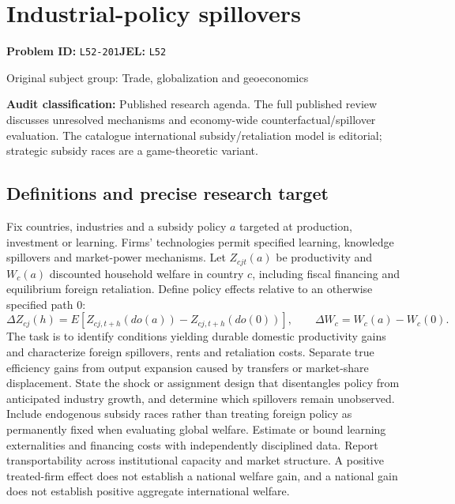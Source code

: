\documentclass[11pt,a4paper]{article}
\begin{document}
\section*{Industrial-policy spillovers}
\textbf{Problem ID:} \texttt{L52-201}\quad \textbf{JEL:} \texttt{L52}\par
\label{problem:OP-0346}
{\sffamily\small\color{muted}Original subject group: Trade, globalization and geoeconomics\par}
\label{definitions:problem:30007628}
\textbf{Audit classification:} Published research agenda. The full published review discusses unresolved mechanisms and economy-wide counterfactual/spillover evaluation. The catalogue international subsidy/retaliation model is editorial; strategic subsidy races are a game-theoretic variant.
\subsection*{Definitions and precise research target}
Fix countries, industries and a subsidy policy \(a\) targeted at production, investment or learning. Firms' technologies permit specified learning, knowledge spillovers and market-power mechanisms. Let \(Z_{cjt}(a)\) be productivity and \(W_c(a)\) discounted household welfare in country \(c\), including fiscal financing and equilibrium foreign retaliation. Define policy effects relative to an otherwise specified path \(0\):
\[\Delta Z_{cj}(h)=E[Z_{cj,t+h}(do(a))-Z_{cj,t+h}(do(0))],\qquad \Delta W_c=W_c(a)-W_c(0).\]
The task is to identify conditions yielding durable domestic productivity gains and characterize foreign spillovers, rents and retaliation costs. Separate true efficiency gains from output expansion caused by transfers or market-share displacement. State the shock or assignment design that disentangles policy from anticipated industry growth, and determine which spillovers remain unobserved. Include endogenous subsidy races rather than treating foreign policy as permanently fixed when evaluating global welfare. Estimate or bound learning externalities and financing costs with independently disciplined data. Report transportability across institutional capacity and market structure. A positive treated-firm effect does not establish a national welfare gain, and a national gain does not establish positive aggregate international welfare.
\end{document}
